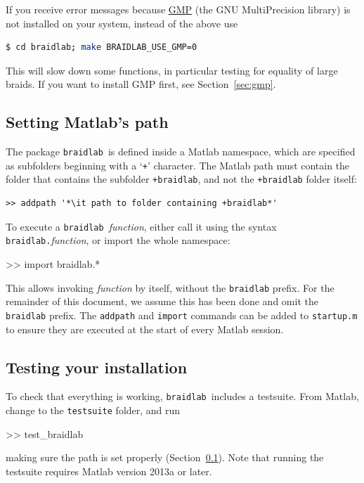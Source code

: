 \documentclass[12pt]{article}
\newcommand{\braidlab}{\texttt{braidlab}}%
\begin{document}
%
If you receive error messages because \href{https://gmplib.org/}{GMP} (the GNU
MultiPrecision library) is not installed on your system, instead of the above
use
\begin{lstlisting}[frame=single,framerule=0pt,escapechar=*,%
  language=bash,backgroundcolor=\color{white}]
$ cd braidlab; make BRAIDLAB_USE_GMP=0
\end{lstlisting}
This will slow down some functions, in particular testing for equality of
large braids.  If you want to install GMP first, see Section~\ref{sec:gmp}.

%


\subsection{Setting Matlab's path}
\label{sec:path}

\lstset{language=Matlab}
\lstset{breaklines=true}

The package \braidlab\ is defined inside a Matlab namespace,
 which are specified as subfolders beginning with a
`\lstinline{+}' character.  The Matlab path  must contain
the folder that contains the subfolder \lstinline{+braidlab}, and not the
\lstinline{+braidlab} folder itself:
\begin{lstlisting}[frame=single,framerule=0pt,escapechar=*]
>> addpath '*\it path to folder containing +braidlab*'
\end{lstlisting}
To execute a \braidlab\ \textit{function}, either call it using the syntax
\hbox{\lstinline{braidlab.}\textit{function}}, or import the whole namespace:
\begin{lstbraidlab}
>> import braidlab.*
\end{lstbraidlab}
This allows invoking \textit{function} by itself, without the
\lstinline{braidlab} prefix.  For the remainder of this document, we
assume this has been done and omit the \lstinline{braidlab} prefix.
The \lstinline{addpath} and \lstinline{import} commands can be added
to \lstinline{startup.m} to ensure they are executed at the start of
every Matlab session.


\subsection{Testing your installation}

To check that everything is working, \braidlab\ includes a testsuite.  From
Matlab, change to the \lstinline{testsuite} folder, and run
\begin{lstbraidlab}
>> test_braidlab
\end{lstbraidlab}
making sure the path is set properly (Section~\ref{sec:path}).
Note that running the testsuite requires Matlab version 2013a or later.
\end{document}

